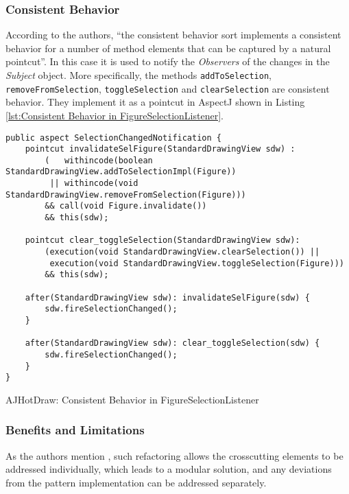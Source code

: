 \subsubsection{Consistent Behavior}
According to the authors\cite{marin2005classification}, ``the consistent behavior sort implements a consistent behavior for a number of method elements that can be captured by a natural pointcut''.
In this case it is used to notify the \textit{Observers} of the changes in the \textit{Subject} object.
More specifically, the methods \texttt{addToSelection}, \texttt{removeFromSelection}, \texttt{toggleSelection} and \texttt{clearSelection} are consistent behavior.
They implement it as a pointcut in AspectJ shown in Listing \ref{lst:Consistent Behavior in FigureSelectionListener}.

\begin{sourcecode} [H]
	\begin{lstlisting}[language=AspectJ]
public aspect SelectionChangedNotification {
	pointcut invalidateSelFigure(StandardDrawingView sdw) :
		(   withincode(boolean StandardDrawingView.addToSelectionImpl(Figure)) 
		 || withincode(void StandardDrawingView.removeFromSelection(Figure)))
		&& call(void Figure.invalidate()) 
		&& this(sdw);

	pointcut clear_toggleSelection(StandardDrawingView sdw):
		(execution(void StandardDrawingView.clearSelection()) ||
		 execution(void StandardDrawingView.toggleSelection(Figure)))
		&& this(sdw);

	after(StandardDrawingView sdw): invalidateSelFigure(sdw) {
		sdw.fireSelectionChanged();
	}

	after(StandardDrawingView sdw): clear_toggleSelection(sdw) {
		sdw.fireSelectionChanged();
	}
}
	\end{lstlisting}
	\caption{AJHotDraw: Consistent Behavior in FigureSelectionListener}
	\label{lst:Consistent Behavior in FigureSelectionListener}
\end{sourcecode}

\subsubsection{Benefits and Limitations}
As the authors mention \cite{marin2005approach}, such refactoring allows the crosscutting elements to be addressed individually, which leads to a modular solution, and any deviations from the pattern implementation can be addressed separately.

